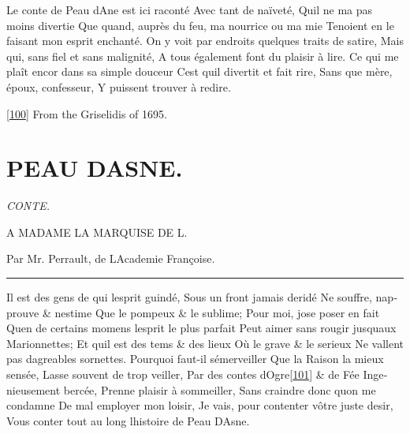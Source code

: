 \documentclass[14pt,a4paper]{memoir}
\begin{document}
\begin{otherlanguage}{french}
{Le conte de Peau d\textquotesingle Ane est ici raconté} {Avec tant de
naïveté,} {Qu\textquotesingle il ne m\textquotesingle a pas moins
divertie} {Que quand, auprès du feu, ma nourrice ou ma mie } {Tenoient
en le faisant mon esprit enchanté.} {On y voit par endroits quelques
traits de satire, } {Mais qui, sans fiel et sans malignité,} {A tous
également font du plaisir à lire.} {Ce qui me plaît encor dans sa simple
douceur} {C\textquotesingle est qu\textquotesingle il divertit et fait
rire,} {Sans que mère, époux, confesseur,} {Y puissent trouver à
redire.}

\protect\hypertarget{4533318093929944247_33931-h-2.htm.xhtmlux5cux23Footnote_100}{}{}\protect\hyperlink{4533318093929944247_33931-h-2.htm.xhtmlux5cux23FNanchor_100}{{{[}100{]}}}
From the Griselidis of 1695.

\section{PEAU D\textquotesingle ASNE.}

\emph{CONTE.}

{A MADAME LA MARQUISE DE L.}

{Par Mr. Perrault, de L\textquotesingle Academie Françoise.}

\begin{center}\rule{0.5\linewidth}{0.5pt}\end{center}

{Il est des gens de qui l\textquotesingle esprit guindé,} {Sous un front
jamais deridé} {Ne souffre, n\textquotesingle approuve \&
n\textquotesingle estime} {Que le pompeux \& le sublime;} {Pour moi,
j\textquotesingle ose poser en fait} {Qu\textquotesingle en de certains
momens l\textquotesingle esprit le plus parfait } {Peut aimer sans
rougir jusqu\textquotesingle aux Marionnettes;} {Et
qu\textquotesingle il est des tems \& des lieux} {Où le grave \& le
serieux} {Ne vallent pas d\textquotesingle agreables sornettes.}
{Pourquoi faut-il s\textquotesingle émerveiller} {Que la Raison la mieux
sensée,} {Lasse souvent de trop veiller,} {Par des contes
d\textquotesingle Ogre\protect\hypertarget{4533318093929944247_33931-h-2.htm.xhtmlux5cux23FNanchor_101}{}{}\protect\hyperlink{4533318093929944247_33931-h-2.htm.xhtmlux5cux23Footnote_101}{{[}101{]}}
\& de Fée} {Ingenieusement bercée,} {Prenne plaisir à sommeiller,} {Sans
craindre donc qu\textquotesingle on me condamne} {De mal employer mon
loisir,} {Je vais, pour contenter vôtre juste desir,} {Vous conter tout
au long l\textquotesingle histoire de Peau D\textquotesingle Asne.}


\end{otherlanguage}
\end{document}
